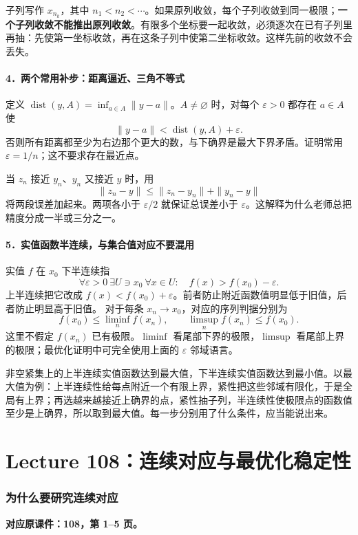 \documentclass[11pt,a4paper]{article}
\newcommand{\eps}{\varepsilon}
\DeclareMathOperator{\dist}{dist}
\theoremstyle{definition}\newtheorem{definition}{定义}\newtheorem{example}{例}
\begin{document}
子列写作 $x_{n_k}$，其中 $n_1<n_2<\cdots$。如果原列收敛，每个子列收敛到同一极限；\textbf{一个子列收敛不能推出原列收敛}。有限多个坐标要一起收敛，必须逐次在已有子列里再抽：先使第一坐标收敛，再在这条子列中使第二坐标收敛。这样先前的收敛不会丢失。

\subsection*{4．两个常用补步：距离逼近、三角不等式}
定义 $\dist(y,A)=\inf_{a\in A}\|y-a\|$。$A\ne\varnothing$ 时，对每个 $\eps>0$ 都存在 $a\in A$ 使
\[\|y-a\|<\dist(y,A)+\eps.\]
否则所有距离都至少为右边那个更大的数，与下确界是最大下界矛盾。证明常用 $\eps=1/n$；这不要求存在最近点。

当 $z_n$ 接近 $y_n$、$y_n$ 又接近 $y$ 时，用
\[\|z_n-y\|\le\|z_n-y_n\|+\|y_n-y\|\]
将两段误差加起来。两项各小于 $\eps/2$ 就保证总误差小于 $\eps$。这解释为什么老师总把精度分成一半或三分之一。

\subsection*{5．实值函数半连续，与集合值对应不要混用}
实值 $f$ 在 $x_0$ 下半连续指
\[\forall\eps>0\ \exists U\ni x_0\ \forall x\in U:\quad f(x)>f(x_0)-\eps.\]
上半连续把它改成 $f(x)<f(x_0)+\eps$。前者防止附近函数值明显低于旧值，后者防止明显高于旧值。
对于每条 $x_n\to x_0$，对应的序列判据分别为
\[f(x_0)\le\liminf_n f(x_n),\qquad
\limsup_n f(x_n)\le f(x_0).\]
这里不假定 $f(x_n)$ 已有极限。$\liminf$ 看尾部下界的极限，$\limsup$ 看尾部上界的极限；最优化证明中可完全使用上面的 $\eps$ 邻域语言。

非空紧集上的上半连续实值函数达到最大值，下半连续实值函数达到最小值。以最大值为例：上半连续性给每点附近一个有限上界，紧性把这些邻域有限化，于是全局有上界；再选越来越接近上确界的点，紧性抽子列，半连续性使极限点的函数值至少是上确界，所以取到最大值。每一步分别用了什么条件，应当能说出来。

\clearpage
\part{Lecture 108：连续对应与最优化稳定性}
\setcounter{section}{0}

\clearpage\section{为什么要研究连续对应}\label{g:108:1}

\textbf{对应原课件：108，第 1--5 页。}
\end{document}
